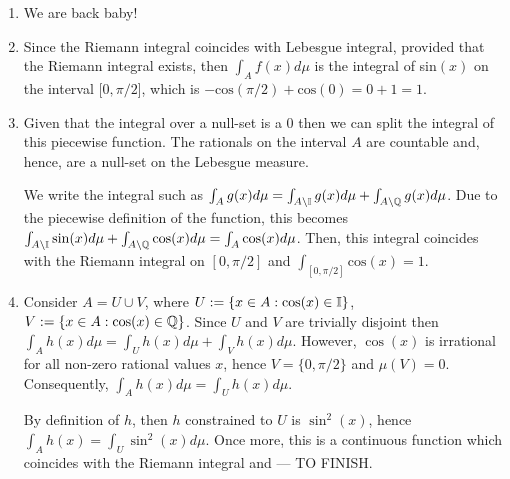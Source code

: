 \documentclass{article}
\begin{document}
\begin{enumerate}[label=(\roman*)]
	\item We are back baby!
			
    \item Since the Riemann integral coincides with Lebesgue integral, provided that the Riemann integral exists, then $\int_A f(x) d\mu$ is the integral of sin$(x)$ on the interval [$0, \pi/2$], which is $-\text{cos}(\pi/2) + \text{cos}(0) = 0 + 1 = 1$. 
    \item Given that the integral over a null-set is a 0 then we can split the integral of this piecewise function. The rationals on the interval $A$ are countable and, hence, are a null-set on the Lebesgue measure. \newline

    We write the integral such as $\int_A g(x) d\mu = \int_{A \setminus \mathbb{I}} g(x) d\mu + \int_{A \setminus \mathbb{Q}} g(x) d\mu$. Due to the piecewise definition of the function, this becomes $\int_{A \setminus \mathbb{I}} \sin(x) d\mu + \int_{A \setminus \mathbb{Q}} \cos(x) d\mu = \int_{A} \cos(x) d\mu$. Then, this integral coincides with the Riemann integral on $[0, \pi/2]$ and $\int_{[0, \pi/2]} \text{cos}(x) = 1$.


    \item Consider $A = U \cup V$, where $U := \{ x \in A : \cos(x) \in \mathbb{I} \}$, $V := \{ x \in A : \cos(x) \in \mathbb{Q} \}$. Since $U$ and $V$ are trivially disjoint then $\int_A h(x) d\mu = \int_U h(x) d\mu + \int_V h(x) d\mu$. However, $\cos(x)$ is irrational for all non-zero rational values $x$, hence $V = \{ 0, \pi/2 \}$ and $\mu(V) = 0$. Consequently, $\int_A h(x) d\mu = \int_U h(x) d\mu$. \newline 

    By definition of $h$, then $h$ constrained to $U$ is $\sin^2(x)$, hence $\int_A h(x) = \int_U \sin^2(x) d\mu$. Once more, this is a continuous function which coincides with the Riemann integral and --- TO FINISH.
\end{enumerate}
\end{document}
